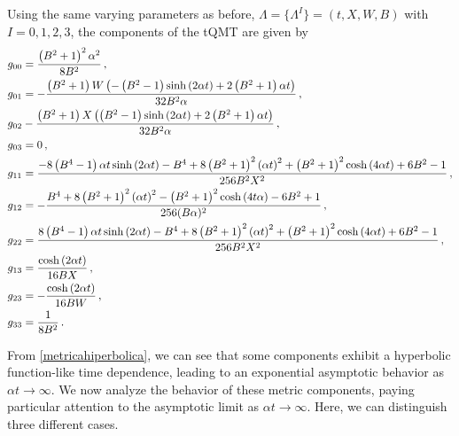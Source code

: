 \documentclass[12pt]{iopart}
\begin{document}
Using the same varying parameters as before, $\Lambda=\{\Lambda^I\}= (t, X, W, B)$ with $I=0,1,2,3$, the components of the tQMT are given by
\begin{subequations} \allowdisplaybreaks
\label{metricahiperbolica}
    \begin{align}
    g_{00}&=\frac{\left(B^2+1\right)^2\alpha^2}{8 B^2}\,,\\
    g_{01}&=-\frac{\left(B^2+1\right) W \left(-\left(B^2-1\right) \sinh \left(2 \alpha t\right)+2 \left(B^2+1\right) \alpha t\right)}{32 B^2 \alpha}\,,\\
   g_{02}&-\frac{\left(B^2+1\right) X \left(\left(B^2-1\right) \sinh \left(2 \alpha  t\right)+2 \left(B^2+1\right) \alpha t \right)}{32 B^2 \alpha}\,,\\
   g_{03}&=0 \,,\\
    g_{11} &=\frac{-8 \left(B^4-1\right)  \alpha  t \sinh \left(2  \alpha t\right)-B^4+8
   \left(B^2+1\right)^2  \left(\alpha t \right)^2+\left(B^2+1\right)^2 \cosh \left(4  \alpha t\right)+6 B^2-1}{256 B^2 X^2}\,, \\
     g_{12} &=-\frac{B^4+8 \left(B^2+1\right)^2 \left(\alpha t\right)^2 -\left(B^2+1\right)^2 \cosh \left(4 t
  \alpha\right)-6 B^2+1}{256 (B\alpha)^2 }\,, \\ 
   g_{22} &=\frac{8 \left(B^4-1\right) \alpha t \sinh \left(2 \alpha t\right)-B^4+8
   \left(B^2+1\right)^2 \left(\alpha t\right)^2+\left(B^2+1\right)^2 \cosh \left(4 \alpha t\right)+6 B^2-1}{256 B^2 X^2}\,, \\
    g_{13} &=\frac{\cosh \left(2 \alpha t\right)}{16 B X}\,,\\
    g_{23} &=-\frac{\cosh \left(2 \alpha t\right)}{16 B W}\,,\\
     g_{33} &=\frac{1}{8 B^2}\,.
    \end{align}
\end{subequations}    

From \eqref{metricahiperbolica}, we can see that some components exhibit a hyperbolic function-like time dependence, leading to an exponential asymptotic behavior as $\alpha t \to \infty$. We now analyze the behavior of these metric components, paying particular attention to the asymptotic limit as $\alpha t \to\infty$. Here, we can distinguish three different cases. 
\end{document}
